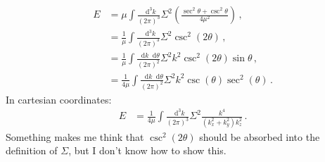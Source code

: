\documentclass{article}
\newcommand*\diff{\mathop{}\!\mathrm{d}}
\newcommand*\p[1]{\left(#1\right)}
\newcommand*\f[2]{\frac{#1}{#2}}
\begin{document}
\begin{align}
E&=\mu\int\f{\diff^3 k}{(2\pi)^3}\Sigma^2\p{\f{\sec^2\theta+\csc^2\theta}{4\mu^2}}\,,\\
&=\f{1}{\mu}\int\f{\diff^3 k}{(2\pi)^3}\Sigma^2\csc^2(2\theta)\,,\\
&=\f{1}{\mu}\int\f{\diff k\diff\theta}{(2\pi)^2}\Sigma^2k^2\csc^2(2\theta)\sin\theta\,,\\
&=\f{1}{4\mu}\int\f{\diff k\diff\theta}{(2\pi)^2}\Sigma^2k^2\csc(\theta)\sec^2(\theta)\,.
\end{align}
In cartesian coordinates:
\begin{align}
E&=\f{1}{4\mu}\int\f{\diff^3 k}{(2\pi)^3}\Sigma^2\f{k^4}{(k_x^2+k_y^2)k_z^2}\,.
\end{align}
Something makes me think that $\csc^2(2\theta)$ should be absorbed into the definition of $\Sigma$, but I don't know how to show this.
\pagebreak
\end{document}
